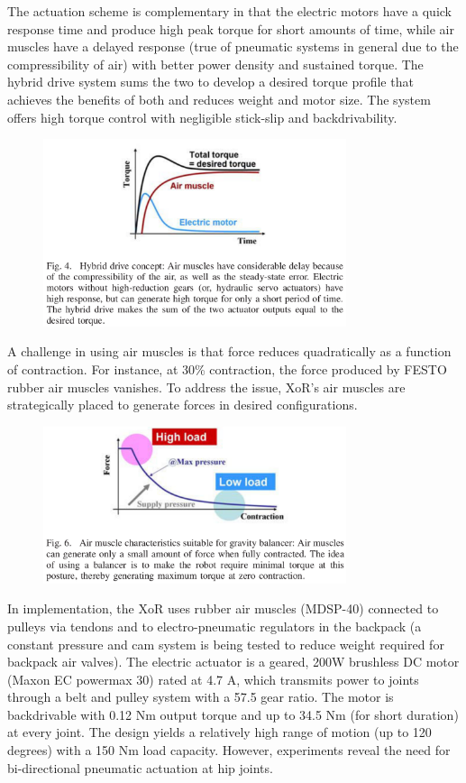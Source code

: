 \begin{refsection}
The actuation scheme is complementary in that the electric motors have a quick response time and produce high peak torque for short amounts of time, while air muscles have a delayed response (true of pneumatic systems in general due to the compressibility of air) with better power density and sustained torque.  The hybrid drive system sums the two to develop a desired torque profile that achieves the benefits of both and reduces weight and motor size.  The system offers high torque control with negligible stick-slip and backdrivability.

\begin{figure}[ht]
  \centering
  \includegraphics[width=3.5in]{exos/figs/xor_hybrid_drive_torque_time.png}
\end{figure}  

A challenge in using air muscles is that force reduces quadratically as a function of contraction.  For instance, at 30\% contraction, the force produced by FESTO rubber air muscles vanishes.  To address the issue, XoR's air muscles are strategically placed to generate forces in desired configurations.  

\begin{figure}[ht]
  \centering
  \includegraphics[width=3.5in]{exos/figs/xor_air_muscle_force_vs_contraction.png}
\end{figure}

In implementation, the XoR uses rubber air muscles (MDSP-40) connected to pulleys via tendons and to electro-pneumatic regulators in the backpack (a constant pressure and cam system is being tested to reduce weight required for backpack air valves).  The electric actuator is a geared, 200W brushless DC motor (Maxon EC powermax 30) rated at 4.7 A, which transmits power to joints through a belt and pulley system with a 57.5 gear ratio. The motor is backdrivable with 0.12 Nm output torque and up to 34.5 Nm (for short duration) at every joint.  The design yields a relatively high range of motion (up to 120 degrees) with a 150 Nm load capacity.  However, experiments reveal the need for bi-directional pneumatic actuation at hip joints.


\end{refsection}
